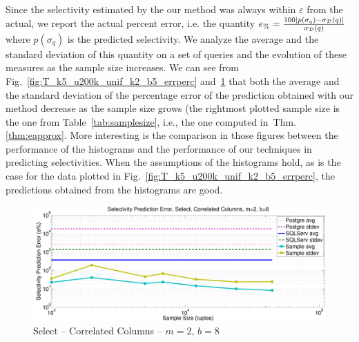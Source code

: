 Since the selectivity estimated by the our method was always within $\varepsilon$
from the actual, we report the actual percent error, i.e. the quantity
$e_\%=\frac{100|p(\sigma_q)-\sigma_{\cal D}(q)|}{\sigma_{\cal D}(q)}$ where $p(\sigma_q)$
is the predicted selectivity. We analyze the average and the standard deviation
of this quantity on a set of queries and the evolution of these measures as
the sample size increases. We can see from
Fig.~\ref{fig:T_k5_u200k_unif_k2_b5_errperc}
and~\ref{fig:T_k2_correl_k2_b8_errperc} that both the average and the standard
deviation of the percentage error of the prediction obtained with our method
decrease as the sample size grows (the rightmost plotted
sample size is the one from Table~\ref{tab:samplesize}, i.e., the one computed 
in~Thm.\ref{thm:eapprox}. More interesting is the comparison in those figures between the performance of the
histograms and the performance of our techniques in predicting selectivities. When
the assumptions of the histograms hold, as is the case for the data plotted in
Fig.~\ref{fig:T_k5_u200k_unif_k2_b5_errperc}, the predictions obtained from the
histograms are good. 

\begin{figure}[ht]
  \centering
  \includegraphics[scale=0.35]{vcfreq/T_k2_correl_k2_b8_errperc}
  \caption{Select -- Correlated Columns -- $m=2$, $b=8$}
  \label{fig:T_k2_correl_k2_b8_errperc}
\end{figure}

